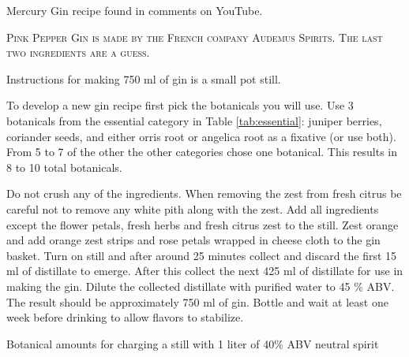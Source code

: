 \documentclass[letterpaper]{recipePMG}
\begin{document}
Mercury Gin recipe found in comments on YouTube.


\textsc{Pink Pepper Gin is made by the French company Audemus Spirits. The last two ingredients are a guess.}


\newpage


Instructions for making 750 ml of gin is a small pot still.

To develop a new gin recipe first pick the botanicals you will use.  Use 3 botanicals from the essential category in Table \ref{tab:essential}: juniper berries, coriander seeds, and either orris root or angelica root as a fixative (or use both).  From 5 to 7 of the other the other categories chose one botanical. This results in 8 to 10 total botanicals. 

Do not crush any of the ingredients. When removing the zest from fresh citrus be careful not to remove any white pith along with the zest. Add all ingredients except the flower petals, fresh herbs and fresh citrus zest to the still.  Zest orange and add orange zest strips and rose petals wrapped in cheese cloth to the gin basket.  Turn on still and after around 25 minutes collect and discard the first 15 ml of distillate to emerge. After this collect the next 425 ml of distillate for use in making the gin. Dilute the collected distillate with purified water to 45 \% ABV. The result should be approximately 750 ml of gin. Bottle and wait at least one week before drinking to allow flavors to stabilize.

Botanical amounts for charging a still with 1 liter of 40\% ABV neutral spirit


\end{document}
